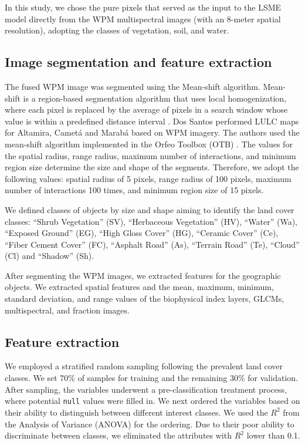 \documentclass[preprint, 3p,
authoryear]{elsarticle} %
\begin{document}
In this study, we chose the pure pixels that served as the input to the
LSME model directly from the WPM multispectral images (with an 8-meter
spatial resolution), adopting the classes of vegetation, soil, and
water.

\hypertarget{image-segmentation-and-feature-extraction}{%
\subsection{Image segmentation and feature
extraction}\label{image-segmentation-and-feature-extraction}}

The fused WPM image was segmented using the Mean-shift algorithm.
Mean-shift is a region-based segmentation algorithm that uses local
homogenization, where each pixel is replaced by the average of pixels in
a search window whose value is within a predefined distance interval
\citep{Comaniciu1997}. Dos Santos performed LULC maps for Altamira,
Cametá and Marabá based on WPM imagery. The authors used the mean-shift
algorithm implemented in the Orfeo Toolbox (OTB) \citep{Grizonnet2017}.
The values for the spatial radius, range radius, maximum number of
interactions, and minimum region size determine the size and shape of
the segments. Therefore, we adopt the following values: spatial radius
of 5 pixels, range radius of 100 pixels, maximum number of interactions
100 times, and minimum region size of 15 pixels.

We defined classes of objects by size and shape aiming to identify the
land cover classes: ``Shrub Vegetation'' (SV), ``Herbaceous Vegetation''
(HV), ``Water'' (Wa), ``Exposed Ground'' (EG), ``High Gloss Cover''
(HG), ``Ceramic Cover'' (Ce), ``Fiber Cement Cover'' (FC), ``Asphalt
Road'' (As), ``Terrain Road'' (Te), ``Cloud'' (Cl) and ``Shadow'' (Sh).

After segmenting the WPM images, we extracted features for the
geographic objects. We extracted spatial features and the mean, maximum,
minimum, standard deviation, and range values of the biophysical index
layers, GLCMs, multispectral, and fraction images.

\hypertarget{feature-extraction}{%
\subsection{Feature extraction}\label{feature-extraction}}

We employed a stratified random sampling following the prevalent land
cover classes. We set 70\% of samples for training and the remaining
30\% for validation. After sampling, the variables underwent a
pre-classification treatment process, where potential \texttt{null}
values were filled in. We next ordered the variables based on their
ability to distinguish between different interest classes. We used the
\(R^2\) from the Analysis of Variance (ANOVA) for the ordering. Due to
their poor ability to discriminate between classes, we eliminated the
attributes with \(R^2\) lower than 0.1.
\end{document}
